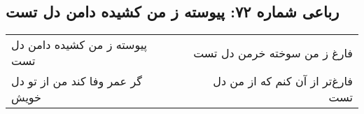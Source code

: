 \begin{center}
\section*{رباعی شماره ۷۲: پیوسته ز من کشیده دامن دل تست}
\label{sec:sh072}
\begin{longtable}{l p{0.5cm} r}
پیوسته ز من کشیده دامن دل تست
&&
فارغ ز من سوخته خرمن دل تست
\\
گر عمر وفا کند من از تو دل خویش
&&
فارغ‌تر از آن کنم که از من دل تست
\\
\end{longtable}
\end{center}
